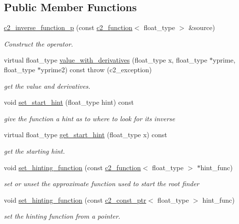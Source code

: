 \subsection*{Public Member Functions}
\begin{DoxyCompactItemize}
\item 
\hyperlink{classc2__inverse__function__p_a764ddeb41fcf06a36c3435be12bf7611}{c2\+\_\+inverse\+\_\+function\+\_\+p} (const \hyperlink{classc2__function}{c2\+\_\+function}$<$ float\+\_\+type $>$ \&source)
\begin{DoxyCompactList}\small\item\em Construct the operator. \end{DoxyCompactList}\item 
virtual float\+\_\+type \hyperlink{classc2__inverse__function__p_a907dbfc4a1ea0530ae76a1ae8704f8ce}{value\+\_\+with\+\_\+derivatives} (float\+\_\+type x, float\+\_\+type $\ast$yprime, float\+\_\+type $\ast$yprime2) const   throw (c2\+\_\+exception)
\begin{DoxyCompactList}\small\item\em get the value and derivatives. \end{DoxyCompactList}\item 
void \hyperlink{classc2__inverse__function__p_a71c6d3be4ae949024979f0968c5bf1f4}{set\+\_\+start\+\_\+hint} (float\+\_\+type hint) const 
\begin{DoxyCompactList}\small\item\em give the function a hint as to where to look for its inverse \end{DoxyCompactList}\item 
virtual float\+\_\+type \hyperlink{classc2__inverse__function__p_a49eac4019f5e0213c9d2111a1007b699}{get\+\_\+start\+\_\+hint} (float\+\_\+type x) const 
\begin{DoxyCompactList}\small\item\em get the starting hint. \end{DoxyCompactList}\item 
void \hyperlink{classc2__inverse__function__p_a69e1d30e9266238303183b25cdcf19ce}{set\+\_\+hinting\+\_\+function} (const \hyperlink{classc2__function}{c2\+\_\+function}$<$ float\+\_\+type $>$ $\ast$hint\+\_\+func)
\begin{DoxyCompactList}\small\item\em set or unset the approximate function used to start the root finder \end{DoxyCompactList}\item 
void \hyperlink{classc2__inverse__function__p_aa8e91ae51b9d0a0f7085f6bd512574fa}{set\+\_\+hinting\+\_\+function} (const \hyperlink{classc2__const__ptr}{c2\+\_\+const\+\_\+ptr}$<$ float\+\_\+type $>$ hint\+\_\+func)
\begin{DoxyCompactList}\small\item\em set the hinting function from a pointer. \end{DoxyCompactList}\end{DoxyCompactItemize}
